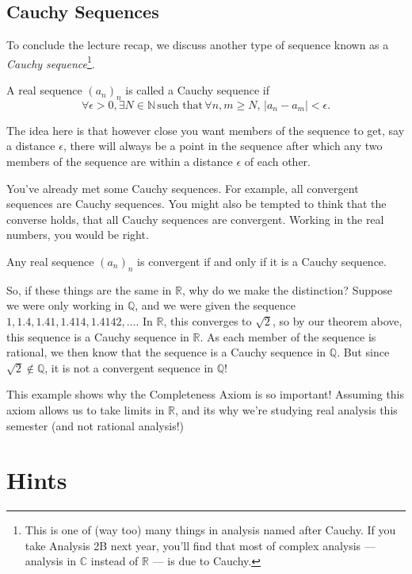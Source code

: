 \documentclass[
  17pt,
  a4paper]{extarticle}
\theoremstyle{plain}
\theoremstyle{plain}
\theoremstyle{plain}
\theoremstyle{plain}
\theoremstyle{plain}
\theoremstyle{definition}
\theoremstyle{definition}
\theoremstyle{definition}
\theoremstyle{remark}
\let\BeginKnitrBlock\begin \let\EndKnitrBlock\end
\renewcommand{\;}{\,}
\begin{document}
\hypertarget{cauchy-sequences}{%
\subsection{Cauchy Sequences}\label{cauchy-sequences}}

To conclude the lecture recap, we discuss another type of sequence known as a \emph{Cauchy sequence}\footnote{This is one of (way too) many things in analysis named after Cauchy. If you take Analysis 2B next year, you'll find that most of complex analysis --- analysis in \(\mathbb{C}\) instead of \(\mathbb{R}\) --- is due to Cauchy.}.

\BeginKnitrBlock{definition}[Cauchy Sequence]
{\label{def:def2} }A real sequence \((a_n)_n\) is called a Cauchy sequence if \[\forall \epsilon >0, \exists N \in \mathbb{N} \; \text{such that} \; \forall n,m \geq N, \; \lvert a_n - a_m\rvert < \epsilon.\]
\EndKnitrBlock{definition}
The idea here is that however close you want members of the sequence to get, say a distance \(\epsilon\), there will always be a point in the sequence after which any two members of the sequence are within a distance \(\epsilon\) of each other.

You've already met some Cauchy sequences. For example, all convergent sequences are Cauchy sequences. You might also be tempted to think that the converse holds, that all Cauchy sequences are convergent. Working in the real numbers, you would be right.

\BeginKnitrBlock{theorem}
{\label{thm:thm3} }Any real sequence \((a_n)_n\) is convergent if and only if it is a Cauchy sequence.
\EndKnitrBlock{theorem}
So, if these things are the same in \(\mathbb{R}\), why do we make the distinction? Suppose we were only working in \(\mathbb{Q}\), and we were given the sequence \(1,1.4,1.41,1.414,1.4142,\ldots\). In \(\mathbb{R}\), this converges to \(\sqrt{2}\), so by our theorem above, this sequence is a Cauchy sequence in \(\mathbb{R}\). As each member of the sequence is rational, we then know that the sequence is a Cauchy sequence in \(\mathbb{Q}\). But since \(\sqrt{2} \not\in \mathbb{Q}\), it is not a convergent sequence in \(\mathbb{Q}\)!

This example shows why the Completeness Axiom is so important! Assuming this axiom allows us to take limits in \(\mathbb{R}\), and its why we're studying real analysis this semester (and not rational analysis!)

\hypertarget{hints}{%
\section{Hints}\label{hints}}
\end{document}
